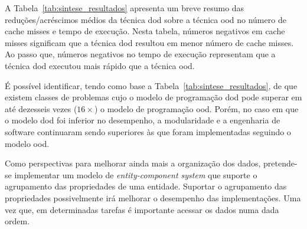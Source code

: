 A Tabela~\ref{tab:sintese_resultados} apresenta um breve resumo das reduções/acréscimos médios da técnica \ac{dod} sobre a técnica \ac{ood} no número de cache misses e tempo de execução.
Nesta tabela, números negativos em cache misses significam que a técnica \ac{dod} resultou em menor número de cache misses.
Ao passo que, números negativos no tempo de execução representam que a técnica \ac{dod} executou mais rápido que a técnica \ac{ood}.

É possível identificar, tendo como base a Tabela~\ref{tab:sintese_resultados}, de que existem classes de problemas cujo o modelo de programação \ac{dod} pode superar em até dezesseis vezes ($16 \times$) o modelo de programação \ac{ood}.
Porém, no caso em que o modelo \ac{dod} foi inferior no desempenho, a modularidade e a engenharia de software continuaram sendo superiores às que foram implementadas seguindo o modelo \ac{ood}.


\begin{table}[h]
\centering
\caption{Síntese dos resultados preliminares.}
\label{tab:sintese_resultados}
\end{table}

Como perspectivas para melhorar ainda mais a organização dos dados, pretende-se implementar um modelo de \textit{entity-component system} que suporte o agrupamento das propriedades de uma entidade.
Suportar o agrupamento das propriedades possivelmente irá melhorar o desempenho das implementações.
Uma vez que, em determinadas tarefas é importante acessar os dados numa dada ordem.

